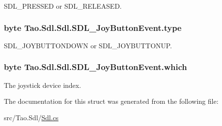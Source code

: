 SDL\_\-PRESSED or SDL\_\-RELEASED. 

\hypertarget{struct_tao_1_1_sdl_1_1_sdl_1_1_s_d_l___joy_button_event_a97d8df7caeed13e83b3ad8903f95d9cb}{
\subsubsection[{type}]{\setlength{\rightskip}{0pt plus 5cm}byte {\bf Tao.Sdl.Sdl.SDL\_\-JoyButtonEvent.type}}}
\label{struct_tao_1_1_sdl_1_1_sdl_1_1_s_d_l___joy_button_event_a97d8df7caeed13e83b3ad8903f95d9cb}


SDL\_\-JOYBUTTONDOWN or SDL\_\-JOYBUTTONUP. 

\hypertarget{struct_tao_1_1_sdl_1_1_sdl_1_1_s_d_l___joy_button_event_a028d7743bcc19aa275f0557d3887858a}{
\subsubsection[{which}]{\setlength{\rightskip}{0pt plus 5cm}byte {\bf Tao.Sdl.Sdl.SDL\_\-JoyButtonEvent.which}}}
\label{struct_tao_1_1_sdl_1_1_sdl_1_1_s_d_l___joy_button_event_a028d7743bcc19aa275f0557d3887858a}


The joystick device index. 



The documentation for this struct was generated from the following file:\begin{DoxyCompactItemize}
\item 
src/Tao.Sdl/\hyperlink{_sdl_8cs}{Sdl.cs}\end{DoxyCompactItemize}
